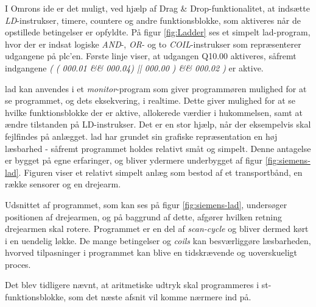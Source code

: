 \noindent I Omrons \gls{ide} er det muligt, ved hjælp af Drag \& Drop-funktionalitet, at indsætte \textit{LD}-instrukser, timere, countere og andre funktionsblokke, som aktiveres når de opstillede betingelser er opfyldte. På figur \ref{fig:Ladder} ses et simpelt \gls{lad}-program, hvor der er indsat logiske \textit{AND}-, \textit{OR}- og to \textit{COIL}-instrukser som repræsenterer udgangene på \gls{plc}'en. Første linje viser, at udgangen Q10.00 aktiveres, såfremt indgangene \textit{( ( 000.01 \&\& 000.04) || 000.00 ) \&\& 000.02 )} er aktive.


\noindent \gls{lad} kan anvendes i et \textit{monitor}-program som giver programmøren mulighed for at se programmet, og dets eksekvering, i realtime. Dette giver mulighed for at se hvilke funktionsblokke der er aktive, allokerede værdier i hukommelsen, samt at ændre tilstanden på LD-instrukser. Det er en stor hjælp, når der eksempelvis skal fejlfindes på anlægget.  
\gls{lad} har grundet sin grafiske repræsentation en høj læsbarhed - såfremt programmet holdes relativt småt og simpelt. Denne antagelse er bygget på egne erfaringer, og bliver ydermere underbygget af figur \ref{fig:siemens-lad}. Figuren viser et relativt simpelt anlæg som bestod af et transportbånd, en række sensorer og en drejearm. 


\noindent Udsnittet af programmet, som kan ses på figur \ref{fig:siemens-lad}, undersøger positionen af drejearmen, og på baggrund af dette, afgører hvilken retning drejearmen skal rotere. Programmet er en del af \textit{scan-cycle} og bliver dermed kørt i en uendelig løkke. De mange betingelser og \textit{coils} kan besværliggøre læsbarheden, hvorved tilpasninger i programmet kan blive en tidskrævende og uoverskueligt proces.

\noindent Det blev tidligere nævnt, at aritmetiske udtryk skal programmeres i \gls{st}-funktionsblokke, som det næste afsnit vil komme nærmere ind på. 

